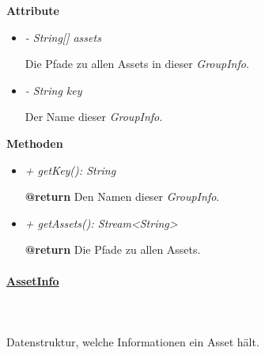         \textbf{Attribute}
        \begin{itemize}
            \item \textit{- String[] assets}
                \begin{leftbar}[0.9\linewidth]
                    Die Pfade zu allen Assets in dieser \textit{GroupInfo}.
                \end{leftbar}
            \item \textit{- String key}
                \begin{leftbar}[0.9\linewidth]
                    Der Name dieser \textit{GroupInfo}.
                \end{leftbar}
        \end{itemize}
        \textbf{Methoden}
        \begin{itemize}
            \item \textit{+ getKey(): String}
                \begin{leftbar}[0.9\linewidth]
                    \textbf{@return} Den Namen dieser \textit{GroupInfo}.
                \end{leftbar}
            \item \textit{+ getAssets(): Stream<String>}
                \begin{leftbar}[0.9\linewidth]
                    \textbf{@return} Die Pfade zu allen Assets.
                \end{leftbar}
        \end{itemize}

    \paragraph{\underline{AssetInfo}} \mbox{}\\
    \\
        Datenstruktur, welche Informationen ein Asset hält.\par

